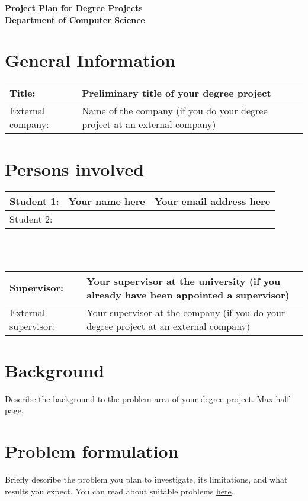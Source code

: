 \documentclass[12pt]{article}
\begin{document}
\begin{center}
\Large \textbf{Project Plan for Degree Projects} \\
\large \textbf{Department of Computer Science}
\end{center}

\section*{General Information}
\begin{tabular} {|p{3.8cm}|p{9cm}|} \hline
Title: & Preliminary title of your degree project \\ \hline
External company: & Name of the company (if you do your degree project at an external company) \\ \hline
\end{tabular}

\section*{Persons involved}
\begin{tabular} {|p{2.2cm}|p{4.7cm}|p{5.47cm}|} \hline
Student 1: & Your name here & Your email address here \\ \hline
Student 2: &  &  \\ \hline
\end{tabular}
\\ \vspace*{0.2cm} \\
\begin{tabular} {|p{3.9cm}|p{8.9cm}|} \hline
Supervisor: & Your supervisor at the university (if you already have been appointed a supervisor) \\ \hline
External supervisor: & Your supervisor at the company (if you do your degree project at an external company) \\ \hline
\end{tabular}

\section*{Background}
Describe the background to the problem area of your degree project. Max half page.

\section*{Problem formulation}
Briefly describe the problem you plan to investigate, its limitations, and what results you expect. You can read about suitable problems \href{https://coursepress.lnu.se/subject/thesis-projects/problem/}{here}.
\end{document}
